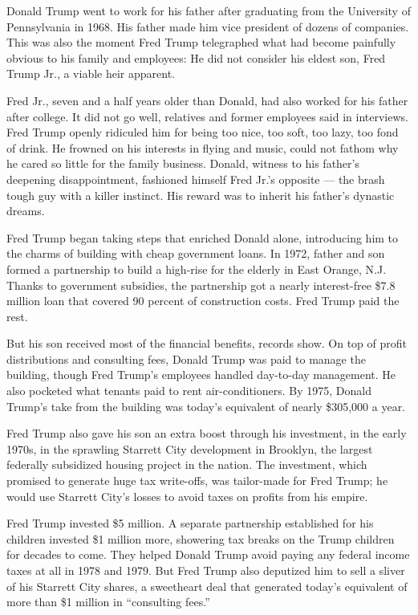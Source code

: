 Donald Trump went to work for his father after graduating from the
University of Pennsylvania in 1968. His father made him vice president
of dozens of companies. This was also the moment Fred Trump telegraphed
what had become painfully obvious to his family and employees: He did
not consider his eldest son, Fred Trump Jr., a viable heir apparent.

Fred Jr., seven and a half years older than Donald, had also worked for
his father after college. It did not go well, relatives and former
employees said in interviews. Fred Trump openly ridiculed him for being
too nice, too soft, too lazy, too fond of drink. He frowned on his
interests in flying and music, could not fathom why he cared so little
for the family business. Donald, witness to his father's deepening
disappointment, fashioned himself Fred Jr.'s opposite --- the brash
tough guy with a killer instinct. His reward was to inherit his father's
dynastic dreams.

Fred Trump began taking steps that enriched Donald alone, introducing
him to the charms of building with cheap government loans. In 1972,
father and son formed a partnership to build a high-rise for the elderly
in East Orange, N.J. Thanks to government subsidies, the partnership got
a nearly interest-free \$7.8 million loan that covered 90 percent of
construction costs. Fred Trump paid the rest.

But his son received most of the financial benefits, records show. On
top of profit distributions and consulting fees, Donald Trump was paid
to manage the building, though Fred Trump's employees handled day-to-day
management. He also pocketed what tenants paid to rent air-conditioners.
By 1975, Donald Trump's take from the building was today's equivalent of
nearly \$305,000 a year.

Fred Trump also gave his son an extra boost through his investment, in
the early 1970s, in the sprawling Starrett City development in Brooklyn,
the largest federally subsidized housing project in the nation. The
investment, which promised to generate huge tax write-offs, was
tailor-made for Fred Trump; he would use Starrett City's losses to avoid
taxes on profits from his empire.

Fred Trump invested \$5 million. A separate partnership established for
his children invested \$1 million more, showering tax breaks on the
Trump children for decades to come. They helped Donald Trump avoid
paying any federal income taxes at all in 1978 and 1979. But Fred Trump
also deputized him to sell a sliver of his Starrett City shares, a
sweetheart deal that generated today's equivalent of more than \$1
million in ``consulting fees.''

